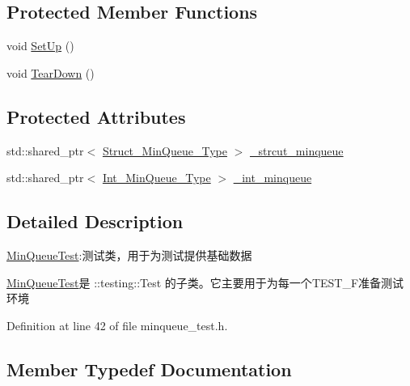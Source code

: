 \subsection*{Protected Member Functions}
\begin{DoxyCompactItemize}
\item 
void \hyperlink{class_min_queue_test_ae801d45bf78b7bb80b278264d3a8e96a}{Set\+Up} ()
\item 
void \hyperlink{class_min_queue_test_a3e949d54ecada54f713ff47d80eb513c}{Tear\+Down} ()
\end{DoxyCompactItemize}
\subsection*{Protected Attributes}
\begin{DoxyCompactItemize}
\item 
std\+::shared\+\_\+ptr$<$ \hyperlink{class_min_queue_test_a9b7e5e987d5e856adc5beb6986dd96a3}{Struct\+\_\+\+Min\+Queue\+\_\+\+Type} $>$ \hyperlink{class_min_queue_test_aed079eb9c6dd8460cc785b0fc6088a97}{\+\_\+strcut\+\_\+minqueue}
\item 
std\+::shared\+\_\+ptr$<$ \hyperlink{class_min_queue_test_ad81df38acc845934accb320c4dbdd582}{Int\+\_\+\+Min\+Queue\+\_\+\+Type} $>$ \hyperlink{class_min_queue_test_a03f9ea0fcc4b820a539d32d6539c2df9}{\+\_\+int\+\_\+minqueue}
\end{DoxyCompactItemize}


\subsection{Detailed Description}
\hyperlink{class_min_queue_test}{Min\+Queue\+Test}\+:测试类，用于为测试提供基础数据 

{\ttfamily \hyperlink{class_min_queue_test}{Min\+Queue\+Test}}是 {\ttfamily \+::testing\+::\+Test} 的子类。它主要用于为每一个{\ttfamily T\+E\+S\+T\+\_\+\+F}准备测试环境 

Definition at line 42 of file minqueue\+\_\+test.\+h.



\subsection{Member Typedef Documentation}
\hypertarget{class_min_queue_test_a627ceae9e25205d70955137bbfc863fd}{}
